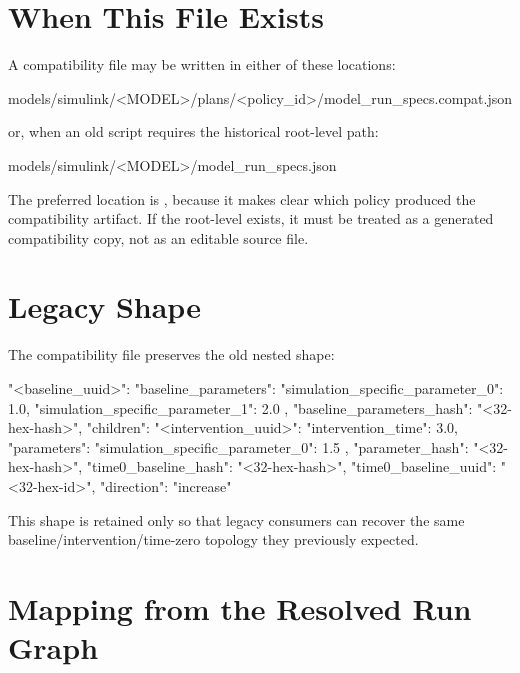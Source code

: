 \documentclass[11pt]{article}
\begin{document}
\section*{When This File Exists}

A compatibility file may be written in either of these locations:

\begin{DocCode}
models/simulink/<MODEL>/plans/<policy_id>/model_run_specs.compat.json
\end{DocCode}

or, when an old script requires the historical root-level path:

\begin{DocCode}
models/simulink/<MODEL>/model_run_specs.json
\end{DocCode}

The preferred location is , because it makes clear which policy produced the compatibility artifact.
If the root-level  exists, it must be treated as a generated compatibility copy, not as an editable source file.

\section*{Legacy Shape}

The compatibility file preserves the old nested shape:

\begin{DocCode}
{
  "<baseline_uuid>": {
    "baseline_parameters": {
      "simulation_specific_parameter_0": 1.0,
      "simulation_specific_parameter_1": 2.0
    },
    "baseline_parameters_hash": "<32-hex-hash>",
    "children": {
      "<intervention_uuid>": {
        "intervention_time": 3.0,
        "parameters": {
          "simulation_specific_parameter_0": 1.5
        },
        "parameter_hash": "<32-hex-hash>",
        "time0_baseline_hash": "<32-hex-hash>",
        "time0_baseline_uuid": "<32-hex-id>",
        "direction": "increase"
      }
    }
  }
}
\end{DocCode}

This shape is retained only so that legacy consumers can recover the same baseline/intervention/time-zero topology they previously expected.

\section*{Mapping from the Resolved Run Graph}
\end{document}
